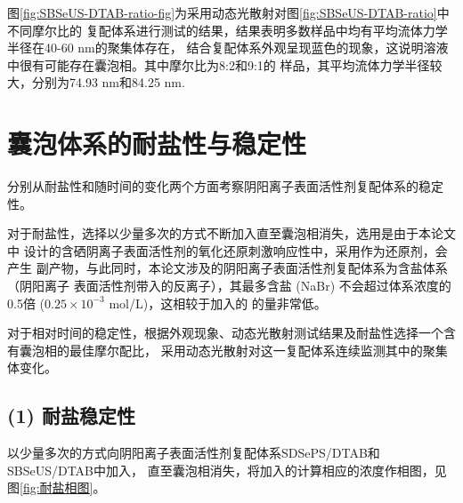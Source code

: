 \documentclass[bachelor,fandolfonts,replaceperiod]{jnuthesis}
\begin{document}
    图\ref{fig:SBSeUS-DTAB-ratio-fig}为采用动态光散射对图\ref{fig:SBSeUS-DTAB-ratio}中不同摩尔比的
    复配体系进行测试的结果，结果表明多数样品中均有平均流体力学半径在40-60 nm的聚集体存在，
    结合复配体系外观呈现蓝色的现象，这说明溶液中很有可能存在囊泡相。其中摩尔比为8:2和9:1的
    样品，其平均流体力学半径较大，分别为74.93 nm和84.25 nm.
    
    \section{囊泡体系的耐盐性与稳定性}
    分别从耐盐性和随时间的变化两个方面考察阴阳离子表面活性剂复配体系的稳定性。
    
    对于耐盐性，选择以少量多次的方式不断加入直至囊泡相消失，选用是由于本论文中
    设计的含硒阴离子表面活性剂的氧化还原刺激响应性中，采用作为还原剂，会产生
    副产物，与此同时，本论文涉及的阴阳离子表面活性剂复配体系为含盐体系（阴阳离子
    表面活性剂带入的反离子），其最多含盐 (NaBr) 不会超过体系浓度的0.5倍 ($0.25 \times 10^{-3}$ mol/L)，这相较于加入的
    的量非常低。
    
    对于相对时间的稳定性，根据外观现象、动态光散射测试结果及耐盐性选择一个含有囊泡相的最佳摩尔配比，
    采用动态光散射对这一复配体系连续监测其中的聚集体变化。
    
    \subsection*{(1) 耐盐稳定性}
    以少量多次的方式向阴阳离子表面活性剂复配体系SDSePS/DTAB和SBSeUS/DTAB中加入，
    直至囊泡相消失，将加入的计算相应的浓度作相图，见图\ref{fig:耐盐相图}。
\end{document}
